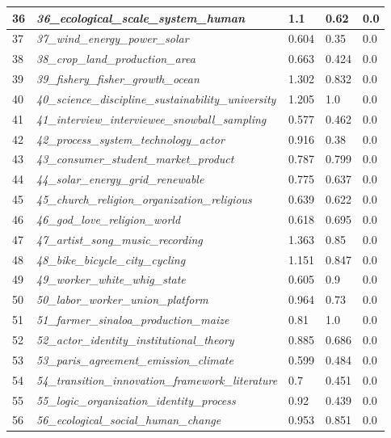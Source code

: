 \documentclass[12pt]{article}
\begin{document}
\begin{longtable}{|l|l|l|l|l|}
36 & \textit{36\_ecological\_scale\_system\_human} & 1.1 & 0.62 & 0.0 \\ \hline
37 & \textit{37\_wind\_energy\_power\_solar} & 0.604 & 0.35 & 0.0 \\ \hline
38 & \textit{38\_crop\_land\_production\_area} & 0.663 & 0.424 & 0.0 \\ \hline
39 & \textit{39\_fishery\_fisher\_growth\_ocean} & 1.302 & 0.832 & 0.0 \\ \hline
40 & \textit{40\_science\_discipline\_sustainability\_university} & 1.205 & 1.0 & 0.0 \\ \hline
41 & \textit{41\_interview\_interviewee\_snowball\_sampling} & 0.577 & 0.462 & 0.0 \\ \hline
42 & \textit{42\_process\_system\_technology\_actor} & 0.916 & 0.38 & 0.0 \\ \hline
43 & \textit{43\_consumer\_student\_market\_product} & 0.787 & 0.799 & 0.0 \\ \hline
44 & \textit{44\_solar\_energy\_grid\_renewable} & 0.775 & 0.637 & 0.0 \\ \hline
45 & \textit{45\_church\_religion\_organization\_religious} & 0.639 & 0.622 & 0.0 \\ \hline
46 & \textit{46\_god\_love\_religion\_world} & 0.618 & 0.695 & 0.0 \\ \hline
47 & \textit{47\_artist\_song\_music\_recording} & 1.363 & 0.85 & 0.0 \\ \hline
48 & \textit{48\_bike\_bicycle\_city\_cycling} & 1.151 & 0.847 & 0.0 \\ \hline
49 & \textit{49\_worker\_white\_whig\_state} & 0.605 & 0.9 & 0.0 \\ \hline
50 & \textit{50\_labor\_worker\_union\_platform} & 0.964 & 0.73 & 0.0 \\ \hline
51 & \textit{51\_farmer\_sinaloa\_production\_maize} & 0.81 & 1.0 & 0.0 \\ \hline
52 & \textit{52\_actor\_identity\_institutional\_theory} & 0.885 & 0.686 & 0.0 \\ \hline
53 & \textit{53\_paris\_agreement\_emission\_climate} & 0.599 & 0.484 & 0.0 \\ \hline
54 & \textit{54\_transition\_innovation\_framework\_literature} & 0.7 & 0.451 & 0.0 \\ \hline
55 & \textit{55\_logic\_organization\_identity\_process} & 0.92 & 0.439 & 0.0 \\ \hline
56 & \textit{56\_ecological\_social\_human\_change} & 0.953 & 0.851 & 0.0 \\ \hline

\end{longtable}
\end{document}
